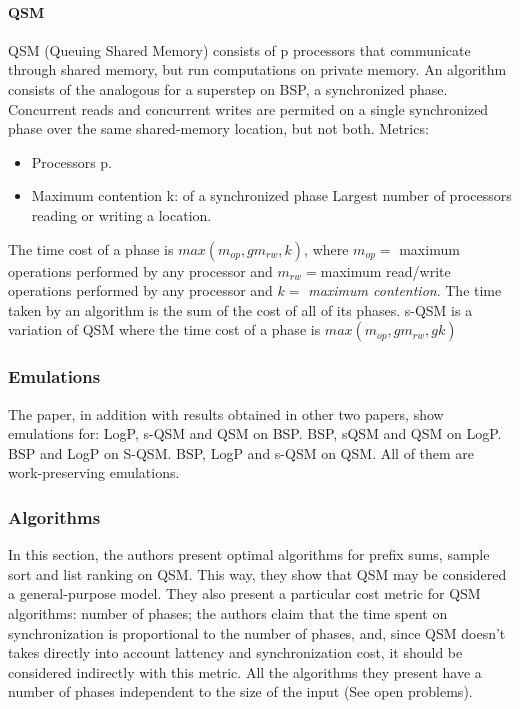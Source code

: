 \documentclass[12pt,a4paper]{article}
\begin{document}
\paragraph{QSM}
QSM (Queuing Shared Memory) consists of p processors that communicate through shared memory, but run computations on private memory. An algorithm consists of the analogous for a superstep on BSP, a synchronized phase. Concurrent reads and concurrent writes are permited on a single synchronized phase over the same shared-memory location, but not both.
Metrics:
\begin{itemize}
	\item Processors p.
	\item Maximum contention k: of a synchronized phase Largest number of processors reading or writing a location.
\end{itemize}
The time cost of a phase is $max(m_{op}, gm_{rw}, k)$, where $m_{op}= $ maximum operations performed by any processor and $m_{rw}=$maximum read/write operations performed by any processor and $k=$ \textit{maximum contention}. The time taken by an algorithm is the sum of the cost of all of its phases.
s-QSM is a variation of QSM where the time cost of a phase is $max(m_{op}, gm_{rw}, gk)$

\subsubsection{Emulations}
The paper, in addition with results obtained in other two papers, show emulations for: LogP, s-QSM and QSM on BSP. BSP, sQSM and QSM on LogP. BSP and LogP on S-QSM. BSP, LogP and s-QSM on QSM. All of them are work-preserving emulations.

\subsubsection{Algorithms}
In this section, the authors present optimal algorithms for prefix sums, sample sort and list ranking on QSM. This way, they show that QSM may be considered a general-purpose model. They also present a particular cost metric for QSM algorithms: number of phases; the authors claim that the time spent on synchronization is proportional to the number of phases, and, since QSM doesn't takes directly into account lattency and synchronization cost, it should be considered indirectly with this metric. All the algorithms they present have a number of phases independent to the size of the input (See open problems).
\end{document}
